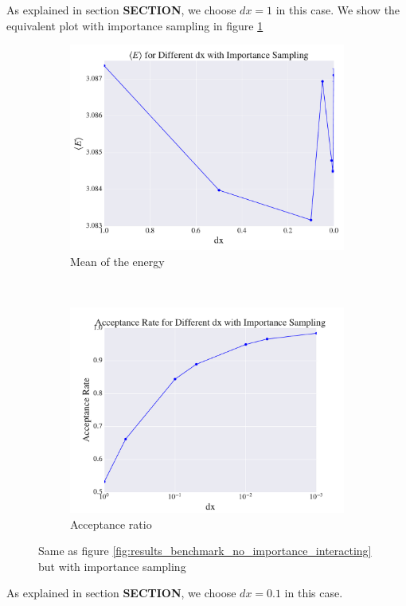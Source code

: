 \documentclass[a4paper, 10pt]{article}
\begin{document}
	 As explained in section \textbf{SECTION}, we choose $dx=1$ in this case. We show the equivalent plot with importance sampling in figure \ref{fig:results_benchmark_importance_interacting}
	 \begin{figure}[ht!]
	 	\centering
	 	\begin{subfigure}[b]{0.8\textwidth}
	 		\centering
	 		\includegraphics[width=\textwidth]{../Results/E_v_dx_importance_interacting.pdf}
	 		\caption{Mean of the energy}
	 	\end{subfigure}
	 	~
	 	\begin{subfigure}[b]{0.8\textwidth}
	 		\centering
	 		\includegraphics[width=\textwidth]{../Results/AC_importance_interacting.pdf}
	 		\caption{Acceptance ratio}
	 	\end{subfigure}
	 	\caption{Same as figure \ref{fig:results_benchmark_no_importance_interacting} but with importance sampling}\label{fig:results_benchmark_importance_interacting}
	 \end{figure}
	 As explained in section \textbf{SECTION}, we choose $dx=0.1$ in this case.
\end{document}
